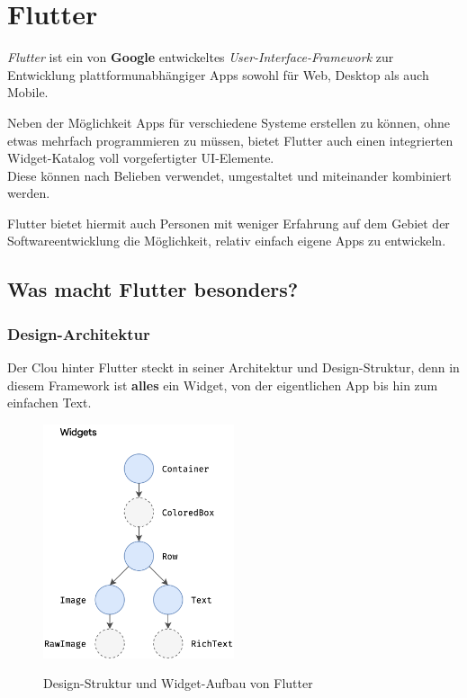 \section{Flutter}

\textit{Flutter} ist ein von \textbf{Google} entwickeltes \textit{User-Interface-Framework} zur
Entwicklung plattformunabhängiger Apps sowohl für Web, Desktop als auch Mobile.

Neben der Möglichkeit Apps für verschiedene Systeme erstellen zu können, ohne etwas mehrfach programmieren
zu müssen, bietet Flutter auch einen integrierten Widget-Katalog voll vorgefertigter UI-Elemente.\\
Diese können nach Belieben verwendet, umgestaltet und miteinander kombiniert werden.

Flutter bietet hiermit auch Personen mit weniger Erfahrung auf dem Gebiet der Softwareentwicklung
die Möglichkeit, relativ einfach eigene Apps zu entwickeln.

\subsection{Was macht Flutter besonders?}

\subsubsection{Design-Architektur}

Der Clou hinter Flutter steckt in seiner Architektur und Design-Struktur, denn in diesem Framework ist \textbf{alles} ein Widget,
von der eigentlichen App bis hin zum einfachen Text.

\begin{figure}[H]
    \begin{center}
        \includegraphics[width=0.5\textwidth]{images/Flutter/design-structure.png}
        \caption{Design-Struktur und Widget-Aufbau von Flutter}
        \cite{flutterDesignArchitecture}
    \end{center}
\end{figure}

